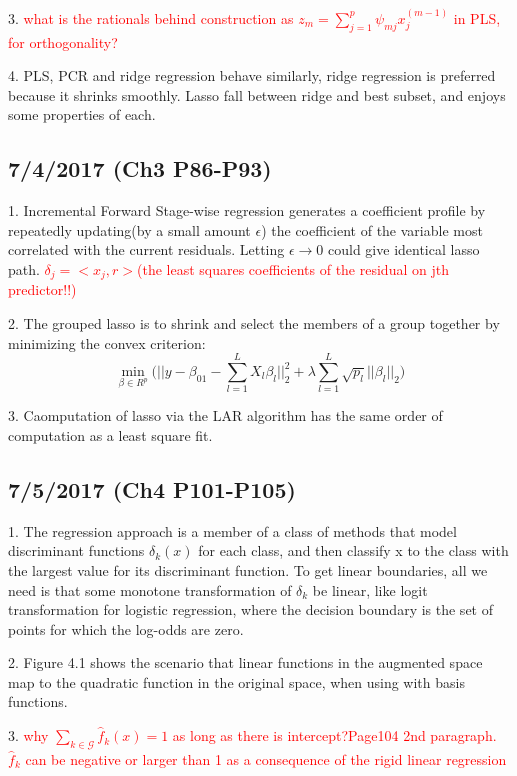 \documentclass[a4paper, 12pt]{article}
\begin{document}
3. \textcolor{red}{ what is the rationals behind construction as $z_m=\sum_{j=1}^{p}\psi_{mj}x_j^{(m-1)} $ in PLS, for orthogonality?}

4. PLS, PCR and ridge regression behave similarly, ridge regression is preferred because it shrinks smoothly. Lasso fall between ridge and best subset, and enjoys some properties of each.

\subsection*{7/4/2017 (Ch3 P86-P93)}

1. Incremental Forward Stage-wise regression generates a coefficient profile by repeatedly updating(by a small amount $\epsilon$) the coefficient of the variable most correlated with the current residuals. Letting $\epsilon \rightarrow 0$ could give identical lasso path. \textcolor{red}{$\delta_j=<x_j,r>$(the least squares coefficients of the residual on jth predictor!!)}

2. The grouped lasso is to shrink and select the members of a group together by minimizing the convex criterion:$$\displaystyle{\min_{\beta \in R^p}}\Bigg(||y-\beta_01-\sum_{l=1}^{L}X_l\beta_l||_2^2 + \lambda\sum_{l=1}^{L}\sqrt{p_l}||\beta_l||_2\Bigg)$$

3. Caomputation of lasso via the LAR algorithm has the same order of computation as a least square fit.


\subsection*{7/5/2017 (Ch4 P101-P105)}

1. The regression approach is a member of a class of methods that model discriminant functions $\delta_k(x)$ for each class, and then classify x to the class with the largest value for its discriminant function. To get linear boundaries, all we need is that some monotone transformation of $\delta_k$ be linear, like logit transformation for logistic regression, where the decision boundary is the set of points for which the log-odds are zero.

2. Figure 4.1 shows the scenario that linear functions in the augmented space map to the quadratic function in the original space, when using with basis functions.

3. \textcolor{red}{why $\sum_{k \in \mathcal{G}}^{}\hat{f}_k(x)=1$ as long as there is intercept?Page104 2nd paragraph. $\hat{f}_k$ can be negative or larger than 1 as a consequence of the rigid linear regression}
\end{document}
